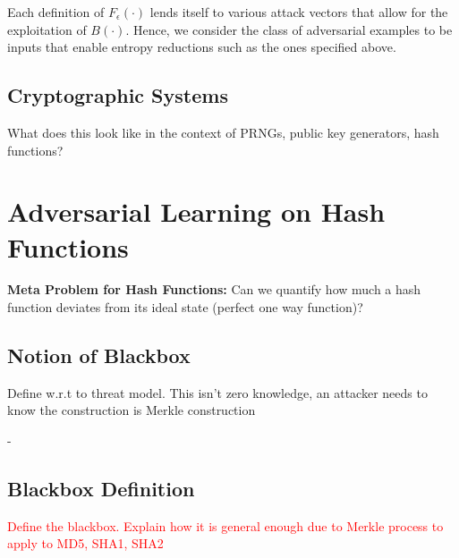 Each definition of $F_{\epsilon}(\cdot)$ lends itself to various attack vectors that allow for the exploitation of $B(\cdot)$. Hence, we consider the class of adversarial examples to be inputs that enable entropy reductions such as the ones specified above. 

\subsection{Cryptographic Systems}
What does this look like in the context of PRNGs, public key generators, hash functions?

\section{Adversarial Learning on Hash Functions}

\textbf{Meta Problem for Hash Functions:} Can we quantify how much a hash function deviates from its ideal state (perfect one way function)?

\subsection{Notion of Blackbox}
Define w.r.t to threat model. This isn't zero knowledge, an attacker needs to know the construction is Merkle construction

- 

\subsection{Blackbox Definition} \label{bbdef}
\textcolor{red}{Define the blackbox. Explain how it is general enough due to Merkle process to apply to MD5, SHA1, SHA2}

